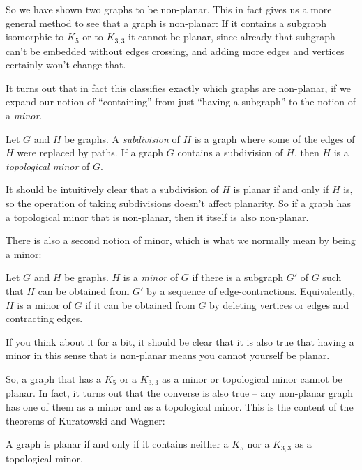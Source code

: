 \documentclass[nobib]{tufte-handout}
\begin{document}
So we have shown two graphs to be non-planar. This in fact gives us a more general method to see that a graph is non-planar: If it contains a subgraph isomorphic to $K_5$ or to $K_{3,3}$ it cannot be planar, since already that subgraph can't be embedded without edges crossing, and adding more edges and vertices certainly won't change that.

It turns out that in fact this classifies exactly which graphs are non-planar, if we expand our notion of ``containing'' from just ``having a subgraph'' to the notion of a \emph{minor}.

\begin{definition}
  Let $G$ and $H$ be graphs. A \emph{subdivision} of $H$ is a graph where some of the edges of $H$ were replaced by paths. If a graph $G$ contains a subdivision of $H$, then $H$ is a \emph{topological minor} of $G$.
\end{definition}

It should be intuitively clear that a subdivision of $H$ is planar if and only if $H$ is, so the operation of taking subdivisions doesn't affect planarity. So if a graph has a topological minor that is non-planar, then it itself is also non-planar.

There is also a second notion of minor, which is what we normally mean by being a minor:

\begin{definition}
  Let $G$ and $H$ be graphs. $H$ is a \emph{minor} of $G$ if there is a subgraph $G'$ of $G$ such that $H$ can be obtained from $G'$ by a sequence of edge-contractions. Equivalently, $H$ is a minor of $G$ if it can be obtained from $G$ by deleting vertices or edges and contracting edges.
\end{definition}

If you think about it for a bit, it should be clear that it is also true that having a minor in this sense that is non-planar means you cannot yourself be planar.

So, a graph that has a $K_5$ or a $K_{3,3}$ as a minor or topological minor cannot be planar. In fact, it turns out that the converse is also true -- any non-planar graph has one of them as a minor and as a topological minor. This is the content of the theorems of Kuratowski and Wagner:

\begin{theorem}[Kuratowski, 1930]
  A graph is planar if and only if it contains neither a $K_5$ nor a $K_{3,3}$ as a topological minor.
\end{theorem}
\end{document}
